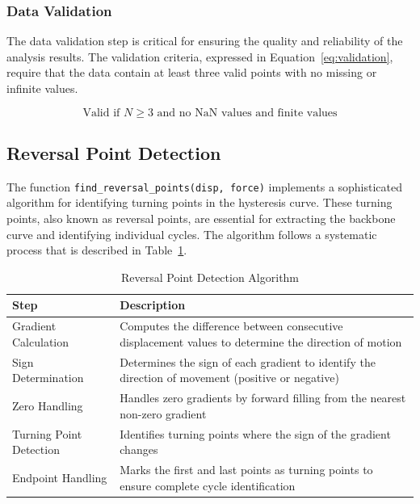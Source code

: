 \documentclass[11pt,a4paper]{article}
\begin{document}
\subsubsection{Data Validation}

The data validation step is critical for ensuring the quality and reliability of the analysis results. The validation criteria, expressed in Equation~\ref{eq:validation}, require that the data contain at least three valid points with no missing or infinite values.

\begin{equation}
\text{Valid if } N \ge 3 \text{ and } \text{no NaN values} \text{ and } \text{finite values}
\label{eq:validation}
\end{equation}

\subsection{Reversal Point Detection}

The function \texttt{find\_reversal\_points(disp, force)} implements a sophisticated algorithm for identifying turning points in the hysteresis curve. These turning points, also known as reversal points, are essential for extracting the backbone curve and identifying individual cycles. The algorithm follows a systematic process that is described in Table~\ref{tab:reversal_algorithm}.

\begin{table}[h]
\centering
\caption{Reversal Point Detection Algorithm}\label{tab:reversal_algorithm}
\begin{tabular}{p{4cm}p{10cm}}
\toprule
\textbf{Step} & \textbf{Description} \\
\midrule
Gradient Calculation & Computes the difference between consecutive displacement values to determine the direction of motion \\
Sign Determination & Determines the sign of each gradient to identify the direction of movement (positive or negative) \\
Zero Handling & Handles zero gradients by forward filling from the nearest non-zero gradient \\
Turning Point Detection & Identifies turning points where the sign of the gradient changes \\
Endpoint Handling & Marks the first and last points as turning points to ensure complete cycle identification \\
\bottomrule
\end{tabular}
\end{table}
\end{document}
